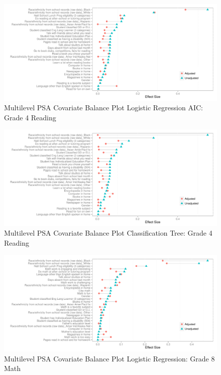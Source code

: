 \documentclass[letterpaper,12p,twoside]{article} %
\begin{document}
\begin{figure}[h!]
\begin{center}
\includegraphics[width=\textwidth]{../Figures2009/g4read-mlpsa-lrAIC-balance.pdf}
\caption{Multilevel PSA Covariate Balance Plot Logistic Regression AIC: Grade 4 Reading}
\end{center}
\end{figure}

\begin{figure}[h!]
\begin{center}
\includegraphics[width=\textwidth]{../Figures2009/g4read-mlpsa-ctree-balance.pdf}
\caption{Multilevel PSA Covariate Balance Plot Classification Tree: Grade 4 Reading}
\end{center}
\end{figure}

\begin{figure}[h!]
\begin{center}
\includegraphics[width=\textwidth]{../Figures2009/g8math-mlpsa-lr-balance.pdf}
\caption{Multilevel PSA Covariate Balance Plot Logistic Regression: Grade 8 Math}
\end{center}
\end{figure}
\end{document}
